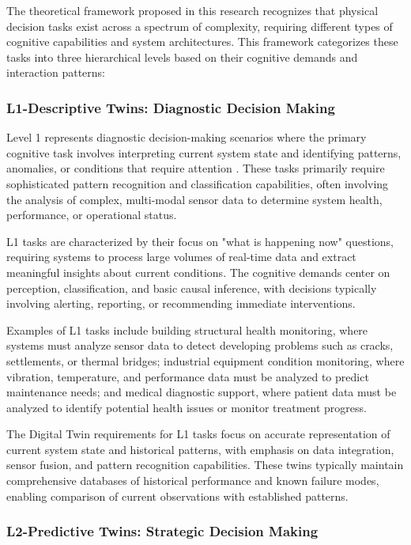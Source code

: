 The theoretical framework proposed in this research recognizes that physical decision tasks exist across a spectrum of complexity, requiring different types of cognitive capabilities and system architectures. This framework categorizes these tasks into three hierarchical levels based on their cognitive demands and interaction patterns:

\subsubsection{L1-Descriptive Twins: Diagnostic Decision Making}

Level 1 represents diagnostic decision-making scenarios where the primary cognitive task involves interpreting current system state and identifying patterns, anomalies, or conditions that require attention \cite{russell2010artificial, pearl2000causality}. These tasks primarily require sophisticated pattern recognition and classification capabilities, often involving the analysis of complex, multi-modal sensor data to determine system health, performance, or operational status.

L1 tasks are characterized by their focus on "what is happening now" questions, requiring systems to process large volumes of real-time data and extract meaningful insights about current conditions. The cognitive demands center on perception, classification, and basic causal inference, with decisions typically involving alerting, reporting, or recommending immediate interventions.

Examples of L1 tasks include building structural health monitoring, where systems must analyze sensor data to detect developing problems such as cracks, settlements, or thermal bridges; industrial equipment condition monitoring, where vibration, temperature, and performance data must be analyzed to predict maintenance needs; and medical diagnostic support, where patient data must be analyzed to identify potential health issues or monitor treatment progress.

The Digital Twin requirements for L1 tasks focus on accurate representation of current system state and historical patterns, with emphasis on data integration, sensor fusion, and pattern recognition capabilities. These twins typically maintain comprehensive databases of historical performance and known failure modes, enabling comparison of current observations with established patterns.

\subsubsection{L2-Predictive Twins: Strategic Decision Making}

